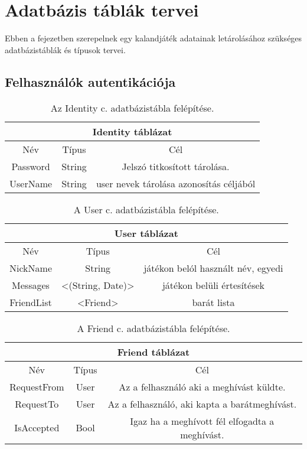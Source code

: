 \chapter{Adatbázis táblák tervei} %
\label{ch:databases_plan}

Ebben a fejezetben szerepelnek egy kalandjáték adatainak letárolásához szükséges adatbázistáblák és típusok tervei.

\section{Felhasználók autentikációja}

\begin{table}[htb]
	\centering
	\begin{tabular}{ |c|c|c| }
		\hline
		\multicolumn{3}{|c|}{Identity táblázat}\\
		\hline
		Név & Típus & Cél \\
		\hline
		Password  & String  & Jelszó titkosított tárolása.  \\
		\hline
		UserName & String & user nevek tárolása azonosítás céljából\\
		\hline
	\end{tabular}
	\caption[Identity adatbázistábla]{Az Identity c. adatbázistábla felépítése.}
	\label{tab:identity}
\end{table}


\begin{table}[htb]
	\centering
	\begin{tabular}{ |c|c|c| }
		\hline
		\multicolumn{3}{|c|}{User táblázat}\\
		\hline
		Név & Típus & Cél \\
		\hline
		NickName & String & játékon belól használt név, egyedi\\
		\hline
		Messages & <(String, Date)> & játékon belüli értesítések\\
		\hline
		FriendList & <Friend> & barát lista\\
		\hline
	\end{tabular}
	\caption[User adatbázistábla]{A User c. adatbázistábla felépítése.}
	\label{tab:user}
\end{table}

\begin{table}[H]
	\centering
	\begin{tabular}{ |c|c|c| }
		\hline
		\multicolumn{3}{|c|}{Friend táblázat}\\
		\hline
		Név & Típus & Cél \\
		\hline
		RequestFrom  & User  & Az a felhasználó aki a meghívást küldte.  \\
		\hline
		RequestTo & User & Az a felhasználó, aki kapta a barátmeghívást.\\
		\hline
		IsAccepted & Bool & Igaz ha a meghívott fél elfogadta a meghívást.\\
		\hline
	\end{tabular}
	\caption[Friend adatbázistábla]{A Friend c. adatbázistábla felépítése.}
	\label{tab:friend}
\end{table}

